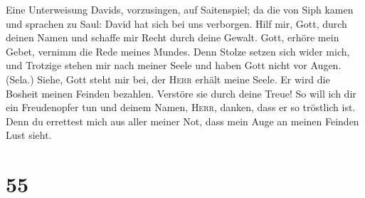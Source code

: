  Eine Unterweisung Davids, vorzusingen, auf Saitenspiel;
 da die von Siph kamen und sprachen zu Saul: David hat
sich bei uns verborgen.  Hilf mir, Gott, durch deinen
Namen und schaffe mir Recht durch deine Gewalt.  Gott,
erhöre mein Gebet, vernimm die Rede meines Mundes.  Denn
Stolze setzen sich wider mich, und Trotzige stehen mir nach meiner Seele
und haben Gott nicht vor Augen. (Sela.)  Siehe, Gott steht
mir bei, der \textsc{Herr} erhält meine Seele.  Er wird
die Bosheit meinen Feinden bezahlen. Verstöre sie durch deine Treue!
 So will ich dir ein Freudenopfer tun und deinem Namen,
\textsc{Herr}, danken, dass er so tröstlich ist.  Denn du
errettest mich aus aller meiner Not, dass mein Auge an meinen Feinden
Lust sieht.

\hypertarget{section-54}{%
\section{55}\label{section-54}}

